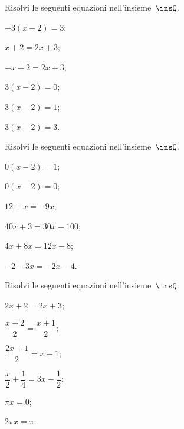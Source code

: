 \begin{esercizio}
\label{ese:15.27}
Risolvi le seguenti equazioni nell'insieme~$\insQ$.
\begin{multicols}{3}
\begin{enumeratea}
\spazielenx
 \item $-3(x-2)=3$;
 \item $x+2=2x+3$;
 \item $-x+2=2x+3$;
 \item $3(x-2)=0$;
 \item $3(x-2)=1$;
 \item $3(x-2)=3$.
\end{enumeratea}
\end{multicols}
\end{esercizio}

\begin{esercizio}
\label{ese:15.28}
Risolvi le seguenti equazioni nell'insieme~$\insQ$.
\begin{multicols}{3}
\begin{enumeratea}
\spazielenx
 \item $0(x-2)=1$;
 \item $0(x-2)=0$;
 \item $12+x=-9x$;
 \item $40x+3=30x-100$;
 \item $4x+8x=12x-8$;
 \item $-2-3x=-2x-4$.
\end{enumeratea}
\end{multicols}
\end{esercizio}

\pagebreak
\begin{esercizio}
\label{ese:15.29}
Risolvi le seguenti equazioni nell'insieme~$\insQ$.
\begin{multicols}{3}
\begin{enumeratea}
\spazielenx
 \item $2x+2=2x+3$;
 \item $\dfrac{x+2}{2}=\dfrac{x+1}{2}$;
 \item $\dfrac{2x+1}{2}=x+1$;
 \item $\dfrac{x}{2}+\dfrac{1}{4}=3x-\dfrac{1}{2}$;
 \item $\pi x=0$;
 \item $2\pi x=\pi$.
\end{enumeratea}
\end{multicols}
\end{esercizio}


